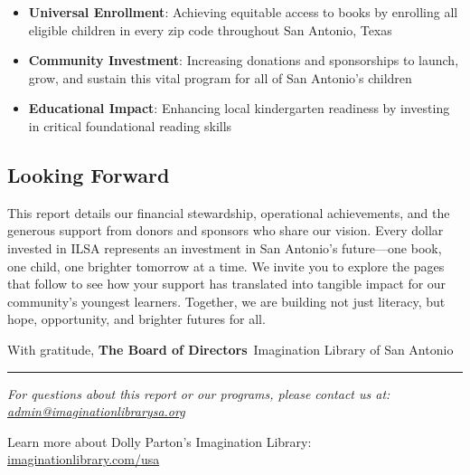 \begin{itemize}[leftmargin=1em] 
  \item \textbf{Universal Enrollment}: Achieving equitable access to books by enrolling all eligible children in every zip code throughout San Antonio, Texas
  \item \textbf{Community Investment}: Increasing donations and sponsorships to launch, grow, and sustain this vital program for all of San Antonio's children
  \item \textbf{Educational Impact}: Enhancing local kindergarten readiness by investing in critical foundational reading skills
\end{itemize}

\subsection*{Looking Forward}
This report details our financial stewardship, operational achievements, and the generous support from donors and sponsors who share our vision. Every dollar invested in ILSA represents an investment in San Antonio's future---one book, one child, one brighter tomorrow at a time.
We invite you to explore the pages that follow to see how your support has translated into tangible impact for our community's youngest learners. Together, we are building not just literacy, but hope, opportunity, and brighter futures for all.

\vspace{1em}
With gratitude,
\vspace{2em}
\textbf{The Board of Directors}\
Imagination Library of San Antonio
\vspace{2em}
\rule{\textwidth}{1pt
}

\vspace{1em}
\noindent \textit{For questions about this report or our programs, please contact us at: \\
 \href{mailto:admin@imaginationlibrarysa.org}{admin@imaginationlibrarysa.org}}

\vspace{0.5em}


\noindent Learn more about Dolly Parton's Imagination Library: \href{https://imaginationlibrary.com/usa/}{imaginationlibrary.com/usa}